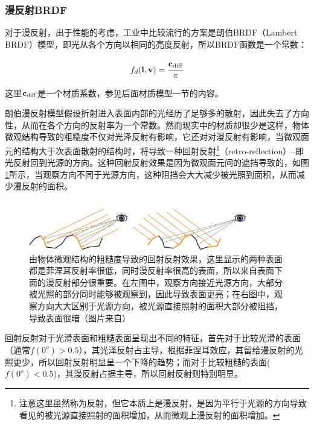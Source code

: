\subsubsection{漫反射BRDF}
对于漫反射，出于性能的考虑，工业中比较流行的方案是朗伯BRDF（Lambert BRDF）模型，即光从各个方向以相同的亮度反射，所以BRDF函数是一个常数：

\begin{equation}\label{eq:intro-lambert-diff}
	f_{d}(\mathbf{l},\mathbf{v})= \cfrac{\mathbf{c}_{\rm diff}}{\pi}
\end{equation}

\noindent 这里$\mathbf{c}_{\rm diff}$是一个材质系数，参见后面材质模型一节的内容。

朗伯漫反射模型假设折射进入表面内部的光经历了足够多的散射，因此失去了方向性，从而在各个方向的反射率为一个常数。然而现实中的材质却很少是这样，物体微观结构导致的粗糙度不仅对光泽反射有影响，它还对对漫反射有影响，当微观面元的结构大于次表面散射的结构时，将导致一种回射反射\footnote{注意这里虽然称为反射，但它本质上是漫反射，是因为平行于光源的方向导致看见的被光源直接照射的面积增加，从而微观上漫反射的面积增加。}（retro-reflection）--即光反射回到光源的方向。这种回射反射效果是因为微观面元间的遮挡导致的，如图\ref{f:intro-retro-reflection}所示，当观察方向不同于光源方向，这种阻挡会大大减少被光照到面积，从而减少漫反射的面积。

\begin{figure}
	\includegraphics[width=0.85\textwidth]{figures/intro/retro-reflection}
	\caption{由物体微观结构的粗糙度导致的回射反射效果，这里显示的两种表面都是菲涅耳反射率很低，同时漫反射率很高的表面，所以来自表面下面的漫反射部分很重要。在左图中，观察方向接近光源方向，大部分被光照的部分同时能够被观察到，因此导致表面更亮；在右图中，观察方向大大区别于光源方向，被光源直接照射的面积大部分被阻挡，导致表面很暗（图片来自\cite{b:rtr}）}
	\label{f:intro-retro-reflection}
\end{figure}

回射反射对于光滑表面和粗糙表面呈现出不同的特征，首先对于比较光滑的表面（通常$f(0^o)>0.5$），其光泽反射占主导，根据菲涅耳效应，其留给漫反射的光照更少，所以回射反射明显呈一个下降的趋势；而对于比较粗糙的表面($f(0^o)<0.5$)，其漫反射占据主导，所以回射反射则特别明显。



